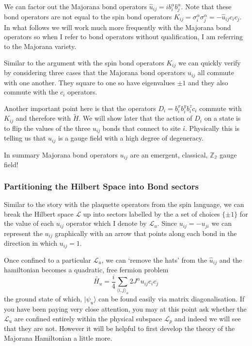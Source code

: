 We can factor out the Majorana bond operators \(\hat{u}_{ij} = i b^\alpha_i b^\alpha_j\). Note that these bond operators are not equal to the spin bond operators \(K_{ij} = \sigma^\alpha_i \sigma^\alpha_j = - \hat{u}_{ij} c_i c_j\). In what follows we will work much more frequently with the Majorana bond operators so when I refer to bond operators without qualification, I am referring to the Majorana variety.

Similar to the argument with the spin bond operators \(K_{ij}\) we can quickly verify by considering three cases that the Majorana bond operators \(u_{ij}\) all commute with one another. They square to one so have eigenvalues \(\pm 1\) and they also commute with the \(c_i\) operators.

Another important point here is that the operators \(D_i = b^x_i b^y_i b^z_i c_i\) commute with \(K_{ij}\) and therefore with \(\tilde{H}\). We will show later that the action of \(D_i\) on a state is to flip the values of the three \(u_{ij}\) bonds that connect to site \(i\). Physically this is telling us that \(u_{ij}\) is a gauge field with a high degree of degeneracy.

In summary Majorana bond operators \(u_{ij}\) are an emergent, classical, \(\mathbb{Z_2}\) gauge field!

\hypertarget{partitioning-the-hilbert-space-into-bond-sectors}{%
\subsubsection{Partitioning the Hilbert Space into Bond sectors}\label{partitioning-the-hilbert-space-into-bond-sectors}}

Similar to the story with the plaquette operators from the spin language, we can break the Hilbert space \(\mathcal{L}\) up into sectors labelled by the a set of choices \(\{\pm 1\}\) for the value of each \(u_{ij}\) operator which I denote by \(\mathcal{L}_u\). Since \(u_{ij} = -u_{ji}\) we can represent the \(u_{ij}\) graphically with an arrow that points along each bond in the direction in which \(u_{ij} = 1\).

Once confined to a particular \(\mathcal{L}_u\), we can `remove the hats' from the \(\hat{u}_{ij}\) and the hamiltonian becomes a quadratic, free fermion problem \[\tilde{H_u} =  \frac{i}{4} \sum_{\langle i,j\rangle_\alpha} 2J^{\alpha} u_{ij} c_i c_j\] the ground state of which, \(|\psi_u\rangle\) can be found easily via matrix diagonalisation. If you have been paying very close attention, you may at this point ask whether the \(\mathcal{L}_u\) are confined entirely within the physical subspace \(\mathcal{L}_p\) and indeed we will see that they are not. However it will be helpful to first develop the theory of the Majorana Hamiltonian a little more.

